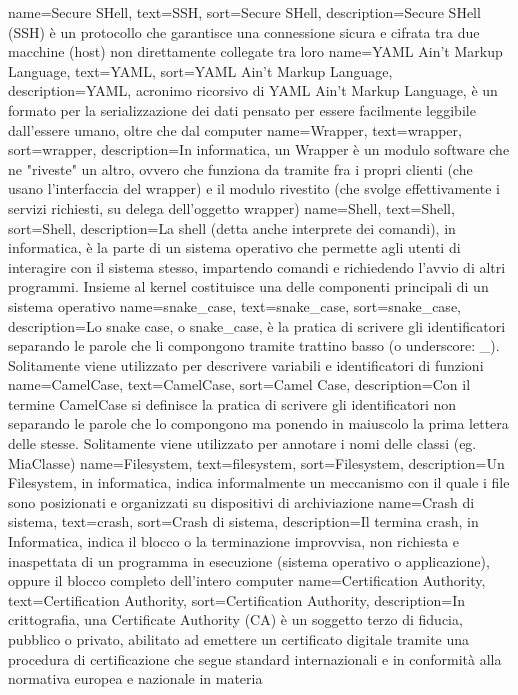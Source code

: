 {
	name=Secure SHell,
	text=SSH,
	sort=Secure SHell,
	description={Secure SHell (SSH) è un protocollo che garantisce una connessione sicura e cifrata tra due macchine (host) non direttamente collegate tra loro}
}
{
	name=YAML Ain't Markup Language,
	text=YAML,
	sort=YAML Ain't Markup Language,
	description={YAML, acronimo ricorsivo di YAML Ain't Markup Language, è un formato per la serializzazione dei dati pensato per essere facilmente leggibile dall'essere umano, oltre che dal computer}
}
{
	name=Wrapper,
	text=wrapper,
	sort=wrapper,
	description={In informatica, un Wrapper è un modulo software che ne "riveste" un altro, ovvero che funziona da tramite fra i propri clienti (che usano l'interfaccia del wrapper) e il modulo rivestito (che svolge effettivamente i servizi richiesti, su delega dell'oggetto wrapper)}
}
{
	name=Shell,
	text=Shell,
	sort=Shell,
	description={La shell (detta anche interprete dei comandi), in informatica, è la parte di un sistema operativo che permette agli utenti di interagire con il sistema stesso, impartendo comandi e richiedendo l'avvio di altri programmi. Insieme al kernel costituisce una delle componenti principali di un sistema operativo}
}
{
	name=snake\_case,
	text=snake\_case,
	sort=snake\_case,
	description={Lo snake case, o snake\_case, è la pratica di scrivere gli identificatori separando le parole che li compongono tramite trattino basso (o underscore: \_). Solitamente viene utilizzato per descrivere variabili e identificatori di funzioni}
}
{
	name=CamelCase,
	text=CamelCase,
	sort=Camel Case,
	description={Con il termine CamelCase si definisce la pratica di scrivere gli identificatori non separando le parole che lo compongono ma ponendo in maiuscolo la prima lettera delle stesse. Solitamente viene utilizzato per annotare i nomi delle classi (eg. MiaClasse)}
}
{
	name=Filesystem,
	text=filesystem,
	sort=Filesystem,
	description={Un Filesystem, in informatica, indica informalmente un meccanismo con il quale i file sono posizionati e organizzati su dispositivi di archiviazione}
}
{
	name=Crash di sistema,
	text=crash,
	sort=Crash di sistema,
	description={Il termina crash, in Informatica, indica il blocco o la terminazione improvvisa, non richiesta e inaspettata di un programma in esecuzione (sistema operativo o applicazione), oppure il blocco completo dell'intero computer}
}
{
	name=Certification Authority,
	text=Certification Authority,
	sort=Certification Authority,
	description={In crittografia, una Certificate Authority (CA) è un soggetto terzo di fiducia, pubblico o privato, abilitato ad emettere un certificato digitale tramite una procedura di certificazione che segue standard internazionali e in conformità alla normativa europea e nazionale in materia}
}
